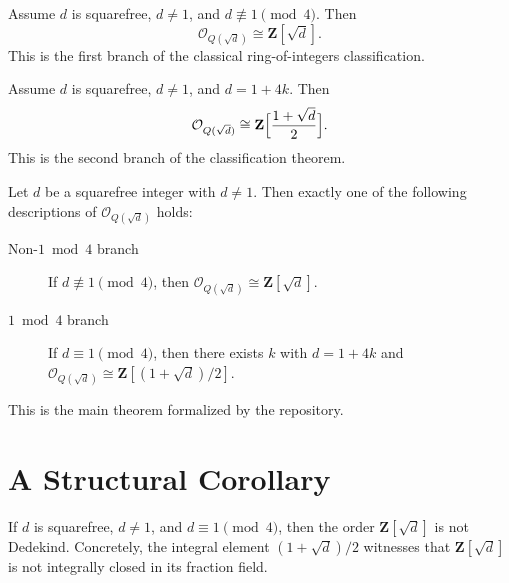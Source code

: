 \begin{theorem}%
\label{thm:roi-zsqrtd}%
\leanok
{}
Assume $d$ is squarefree, $d \neq 1$, and $d \not\equiv 1 \pmod 4$. Then
\[
  \mathcal{O}_{Q(\sqrt d)} \cong \mathbf{Z}[\sqrt d].
\]
This is the first branch of the classical ring-of-integers classification.
\end{theorem}

\begin{theorem}%
\label{thm:roi-zomega}%
\leanok
{}
Assume $d$ is squarefree, $d \neq 1$, and $d = 1 + 4k$. Then
\[
  \mathcal{O}_{Q(\sqrt d)} \cong \mathbf{Z}\Bigl[\frac{1+\sqrt d}{2}\Bigr].
\]
This is the second branch of the classification theorem.
\end{theorem}

\begin{theorem}%
\label{thm:roi-classification}%
\leanok
{}
Let $d$ be a squarefree integer with $d \neq 1$. Then exactly one of the
following descriptions of $\mathcal{O}_{Q(\sqrt d)}$ holds:
\begin{description}
\item[Non-$1 \bmod 4$ branch] If $d \not\equiv 1 \pmod 4$, then
  $\mathcal{O}_{Q(\sqrt d)} \cong \mathbf{Z}[\sqrt d]$.
\item[$1 \bmod 4$ branch] If $d \equiv 1 \pmod 4$, then there exists $k$ with
  $d = 1 + 4k$ and
  $\mathcal{O}_{Q(\sqrt d)} \cong \mathbf{Z}[(1+\sqrt d)/2]$.
\end{description}
This is the main theorem formalized by the repository.
\end{theorem}

\chapter{A Structural Corollary}

\begin{theorem}%
\label{thm:not-dedekind-one}%
\leanok
{}
If $d$ is squarefree, $d \neq 1$, and $d \equiv 1 \pmod 4$, then the order
$\mathbf{Z}[\sqrt d]$ is not Dedekind. Concretely, the integral element
$(1+\sqrt d)/2$ witnesses that $\mathbf{Z}[\sqrt d]$ is not integrally closed in
its fraction field.
\end{theorem}

